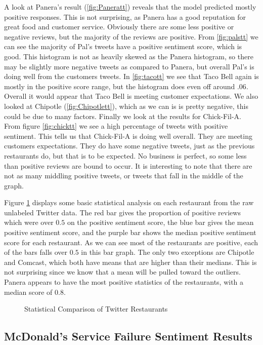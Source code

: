 \documentclass[titlepage,letterpaper]{article}
\begin{document}
A look at Panera's result (\cref{fig:Paneratt}) reveals that the model predicted mostly positive responses. This is not surprising, as Panera has a good reputation for great food and customer service. Obviously there are some less positive or negative reviews, but the majority of the reviews are positive. From \cref{fig:palstt} we can see the majority of Pal's tweets have a positive sentiment score, which is good. This histogram is not as heavily skewed as the Panera histogram, so there may be slightly more negative tweets as compared to Panera, but overall Pal's is doing well from the customers tweets. In \cref{fig:tacott} we see that Taco Bell again is mostly in the positive score range, but the histogram does even off around $.06$. Overall it would appear that Taco Bell is meeting customer expectations. We also looked at Chipotle (\cref{fig:Chipotlett}), which as we can is is pretty negative, this could be due to many factors. Finally we look at the results for Chick-Fil-A. From figure \cref{fig:chicktt} we see a high percentage of tweets with positive sentiment. This tells us that Chick-Fil-A is doing well overall. They are meeting customers expectations. They do have some negative tweets, just as the previous restaurants do, but that is to be expected. No business is perfect, so some less than positive reviews are bound to occur. It is interesting to note that there are not as many middling positive tweets, or tweets that fall in the middle of the graph. 

Figure \ref{compstat} displays some basic statistical analysis on each restaurant from the raw unlabeled Twitter data. The red bar gives the proportion of positive reviews which were over $0.5$ on the positive sentiment score, the blue bar gives the mean positive sentiment score, and the purple bar shows the median positive sentiment score for each restaurant. As we can see most of the restaurants are positive, each of the bars falls over $0.5$ in this bar graph. The only two exceptions are Chipotle and Comcast, which both have means that are higher than their medians. This is not surprising since we know that a mean will be pulled toward the outliers. Panera appears to have the most positive statistics of the restaurants, with a median score of $0.8$. 

\begin{figure}[]
	\centering
	
	\caption{Statistical Comparison of Twitter Restaurants}
	\label{compstat}
\end{figure}


\subsection{McDonald's Service Failure Sentiment Results}
\end{document}
